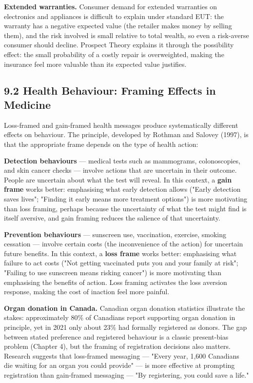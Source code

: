 \documentclass[12pt, letterpaper]{article}
\begin{document}
\textbf{Extended warranties.} Consumer demand for extended warranties on electronics and appliances is difficult to explain under standard EUT: the warranty has a negative expected value (the retailer makes money by selling them), and the risk involved is small relative to total wealth, so even a risk-averse consumer should decline. Prospect Theory explains it through the possibility effect: the small probability of a costly repair is overweighted, making the insurance feel more valuable than its expected value justifies.


\subsection{9.2 Health Behaviour: Framing Effects in Medicine}


Loss-framed and gain-framed health messages produce systematically different effects on behaviour. The principle, developed by Rothman and Salovey (1997), is that the appropriate frame depends on the type of health action:

\textbf{Detection behaviours} --- medical tests such as mammograms, colonoscopies, and skin cancer checks --- involve actions that are uncertain in their outcome. People are uncertain about what the test will reveal. In this context, a \textbf{gain frame} works better: emphasising what early detection allows ("Early detection saves lives"; "Finding it early means more treatment options") is more motivating than loss framing, perhaps because the uncertainty of what the test might find is itself aversive, and gain framing reduces the salience of that uncertainty.

\textbf{Prevention behaviours} --- sunscreen use, vaccination, exercise, smoking cessation --- involve certain costs (the inconvenience of the action) for uncertain future benefits. In this context, a \textbf{loss frame} works better: emphasising what failure to act costs ("Not getting vaccinated puts you and your family at risk"; "Failing to use sunscreen means risking cancer") is more motivating than emphasising the benefits of action. Loss framing activates the loss aversion response, making the cost of inaction feel more painful.

\textbf{Organ donation in Canada.} Canadian organ donation statistics illustrate the stakes: approximately 80\% of Canadians report supporting organ donation in principle, yet in 2021 only about 23\% had formally registered as donors. The gap between stated preference and registered behaviour is a classic present-bias problem (Chapter 4), but the framing of registration decisions also matters. Research suggests that loss-framed messaging --- "Every year, 1,600 Canadians die waiting for an organ you could provide" --- is more effective at prompting registration than gain-framed messaging --- "By registering, you could save a life."
\end{document}
